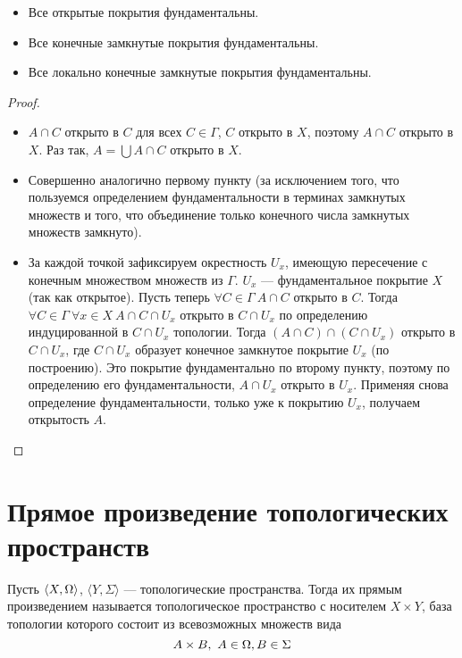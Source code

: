 \begin{theorem}
	\enewline
	\begin{itemize}
		\item Все открытые покрытия фундаментальны.
		\item Все конечные замкнутые покрытия фундаментальны.
		\item Все локально конечные замкнутые покрытия фундаментальны.
	\end{itemize}
\end{theorem}
\begin{proof}
	\enewline
	\begin{itemize}
		\item $A \cap C$ открыто в $C$ для всех $C \in \Gamma$, $C$ открыто в $X$,
			поэтому $A \cap C$ открыто в $X$. Раз так, $A = \bigcup{A \cap C}$
			открыто в $X$.
		\item Совершенно аналогично первому пункту (за исключением того, что
			пользуемся определением фундаментальности в терминах замкнутых множеств
			и того, что объединение только конечного числа замкнутых множеств замкнуто).
		\item За каждой точкой зафиксируем окрестность $U_x$, имеющую
			пересечение с конечным множеством множеств из $\Gamma$. $U_x$ ---
			фундаментальное покрытие $X$ (так как открытое). Пусть теперь
			$\forall C \in \Gamma~ A \cap C$ открыто в $C$. Тогда
			$\forall C \in \Gamma~ \forall x \in X~ A \cap C \cap U_x$ открыто в $C \cap U_x$
			по определению индуцированной в $C \cap U_x$ топологии. Тогда
			$(A \cap C) \cap (C \cap U_x)$ открыто в $C \cap U_x$, где
			$C \cap U_x$ образует конечное замкнутое покрытие $U_x$ (по построению). Это
			покрытие фундаментально по второму пункту, поэтому по определению его 
			фундаментальности, $A \cap U_x$ открыто в $U_x$. Применяя снова
			определение фундаментальности, только уже к покрытию $U_x$, получаем открытость
			$A$.
	\end{itemize}
\end{proof}

\section{Прямое произведение топологических пространств}

\begin{definition}
	Пусть $\langle X, \Omega \rangle$, $\langle Y, \Sigma \rangle$ --- топологические
	пространства. Тогда их прямым произведением называется топологическое пространство
	с носителем $X \times Y$, база топологии которого состоит из всевозможных множеств
	вида
\[
	A \times B,~ A \in \Omega, B \in \Sigma
\]
\end{definition}

